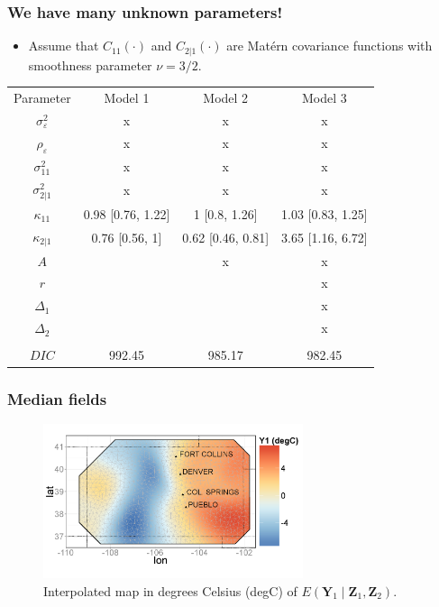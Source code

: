 \documentclass{beamer}
\newcommand{\Yvec}{\mathbf{Y}}
\newcommand{\Zvec}{\mathbf{Z}}
\newcommand{\E}{E}
\begin{document}
\begin{frame}
\frametitle{We have many unknown parameters!}

\begin{itemize}
\item Assume that $C_{11}(\cdot)$ and $C_{2|1}(\cdot)$ are Mat{\'e}rn covariance functions with smoothness parameter $\nu = 3/2$.
\end{itemize}
\small
\begin{center}
\begin{tabular} {cccc}
  { Parameter} 	& {Model 1} 	& {Model 2} & {Model 3} 			 \\
  $\sigma_\varepsilon^2$&  x & x & x \\
  $\rho_\varepsilon$&  x & x & x \\
  $\sigma^2_{11}$& x & x & x \\
  $\sigma^2_{2|1}$& x & x & x \\
  $\kappa_{11}$&0.98 [0.76, 1.22]&1 [0.8, 1.26]&1.03 [0.83, 1.25]\\
  $\kappa_{2|1}$&0.76 [0.56, 1]&0.62 [0.46, 0.81]&3.65 [1.16, 6.72]\\
  $A$&& x & x \\
  $r$&&& x \\
  $\Delta_1$&&& x\\
  $\Delta_2$&&& x \\
  &&&\\
  $DIC$&992.45&985.17&982.45
\end{tabular}
\end{center}
\normalsize
\end{frame}


\begin{frame}
\frametitle{Median fields}

\begin{figure}
\includegraphics[width=3in]{Fig3a1.png}
\caption{Interpolated map in degrees Celsius (degC) of $\E(\Yvec_1 \mid  \Zvec_1,\Zvec_2)$.}
\end{figure}
\end{frame}
\end{document}
